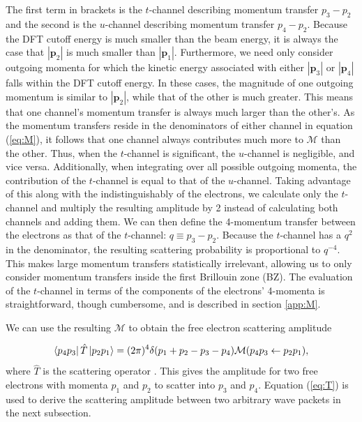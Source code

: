 \documentclass{article}
\begin{document}
The first term in brackets is the $t$-channel describing momentum transfer $p_3
- p_2$ and the second is the $u$-channel describing momentum transfer $p_4 -
p_2$.
Because the DFT cutoff energy is much smaller than the beam energy, it is
always the case that $|\mathbf{p}_2|$ is much smaller than $|\mathbf{p}_1|$.
Furthermore, we need only consider outgoing momenta for which the kinetic
energy associated with either $|\mathbf{p}_3|$ or $|\mathbf{p}_4|$ falls within
the DFT cutoff energy.
In these cases, the magnitude of one outgoing momentum is similar to
$|\mathbf{p}_2|$, while that of the other is much greater.
This means that one channel's momentum transfer is always much larger than the
other's.
As the momentum transfers reside in the denominators of either channel in
equation (\ref{eq:M}), it follows that one channel always contributes much more
to $\mathcal{M}$ than the other.
Thus, when the $t$-channel is significant, the $u$-channel is negligible, and
vice versa.
Additionally, when integrating over all possible outgoing momenta, the
contribution of the $t$-channel is equal to that of the $u$-channel.
Taking advantage of this along with the indistinguishably of the electrons, we
calculate only the $t$-channel and multiply the resulting amplitude by 2
instead of calculating both channels and adding them.
We can then define the 4-momentum transfer between the electrons as that of the
$t$-channel: $q\equiv p_3 - p_2$.
Because the $t$-channel has a $q^2$ in the denominator, the resulting
scattering probability is proportional to $q^{-4}$.
This makes large momentum transfers statistically irrelevant, allowing us to
only consider momentum transfers inside the first Brillouin zone (BZ).
The evaluation of the $t$-channel in terms of the
components of the electrons' 4-momenta is straightforward, though cumbersome,
and is described in section \ref{app:M}.

We can use the resulting $\mathcal{M}$ to obtain the free electron scattering
amplitude

\begin{equation} 
  \label{eq:T} 
  \bra{p_4 p_3}\hat{T}\ket{p_2p_1} 
  = 
  (2\pi)^4\delta(p_1 + p_2 - p_3 - p_4) 
  \mathcal{M}(p_4p_3\leftarrow p_2p_1),
\end{equation}
%
where $\hat{T}$ is the scattering operator \cite{Peskin1995, Lancaster2014}.
This gives the amplitude for two free electrons with momenta $p_1$ and $p_2$ to
scatter into $p_3$ and $p_4$.
Equation (\ref{eq:T}) is used to derive the scattering amplitude between two
arbitrary wave packets in the next subsection.
\end{document}
